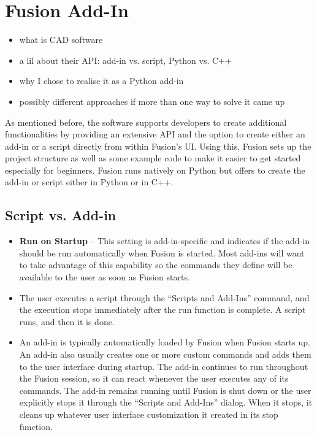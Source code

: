     \section{Fusion Add-In}

\begin{itemize}
    \item what is CAD software 
    \item a lil about their API: add-in vs. script, Python vs. C++
    \item why I chose to realise it as a Python add-in
    \item possibly different approaches if more than one way to solve it came up 
\end{itemize}

As mentioned before, the software supports developers to create additional functionalities by providing an extensive API and the option to create either an add-in or a script directly from within Fusion's UI. 
Using this, Fusion sets up the project structure as well as some example code to make it easier to get started especially for beginners. 
Fusion runs natively on Python but offers to create the add-in or script either in Python or in C++. 

\subsection{Script vs. Add-in}\cite{autodesk_inc_fusion_Script_addin_2025}
\begin{itemize}
    \item \textbf{Run on Startup} – This setting is add-in-specific and indicates if the add-in should be run automatically when Fusion is started.  Most add-ins will want to take advantage of this capability so the commands they define will be available to the user as soon as Fusion starts.
    \item The user executes a script through the “Scripts and Add-Ins” command, and the execution stops immediately after the run function is complete. A script runs, and then it is done.
    \item An add-in is typically automatically loaded by Fusion when Fusion starts up. An add-in also usually creates one or more custom commands and adds them to the user interface during startup. The add-in continues to run throughout the Fusion session, so it can react whenever the user executes any of its commands. The add-in remains running until Fusion is shut down or the user explicitly stops it through the “Scripts and Add-Ins” dialog. When it stops, it cleans up whatever user interface customization it created in its stop function.
\end{itemize}

